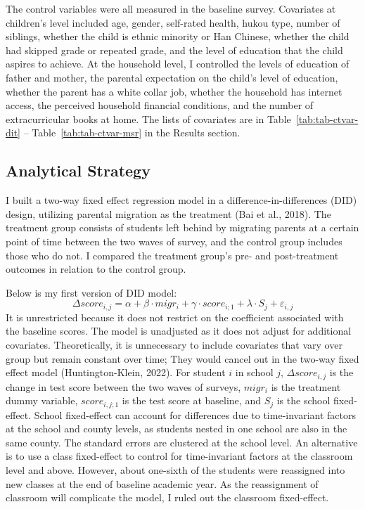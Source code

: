 \documentclass[
  man,floatsintext]{apa7}
\begin{document}
The control variables were all measured in the baseline survey. Covariates at children's level included age, gender, self-rated health, hukou type, number of siblings, whether the child is ethnic minority or Han Chinese, whether the child had skipped grade or repeated grade, and the level of education that the child aspires to achieve. At the household level, I controlled the levels of education of father and mother, the parental expectation on the child's level of education, whether the parent has a white collar job, whether the household has internet access, the perceived household financial conditions, and the number of extracurricular books at home. The lists of covariates are in Table~\ref{tab:tab-ctvar-dit} -- Table~\ref{tab:tab-ctvar-msr} in the Results section.

\hypertarget{analytical-strategy}{%
\subsection{Analytical Strategy}\label{analytical-strategy}}

I built a two-way fixed effect regression model in a difference-in-differences (DID) design, utilizing parental migration as the treatment (Bai et al., 2018). The treatment group consists of students left behind by migrating parents at a certain point of time between the two waves of survey, and the control group includes those who do not. I compared the treatment group's pre- and post-treatment outcomes in relation to the control group.

Below is my first version of DID model: \[\Delta score_{i,j} = \alpha + \beta \cdot migr_{i} + \gamma \cdot score_{i;1} + \lambda \cdot S_{j} + \varepsilon_{i,j}\] It is unrestricted because it does not restrict on the coefficient associated with the baseline scores. The model is unadjusted as it does not adjust for additional covariates. Theoretically, it is unnecessary to include covariates that vary over group but remain constant over time; They would cancel out in the two-way fixed effect model (Huntington-Klein, 2022). For student \(i\) in school \(j\), \(\Delta score_{i,j}\) is the change in test score between the two waves of surveys, \(migr_{i}\) is the treatment dummy variable, \(score_{i,j;1}\) is the test score at baseline, and \(S_{j}\) is the school fixed-effect. School fixed-effect can account for differences due to time-invariant factors at the school and county levels, as students nested in one school are also in the same county. The standard errors are clustered at the school level. An alternative is to use a class fixed-effect to control for time-invariant factors at the classroom level and above. However, about one-sixth of the students were reassigned into new classes at the end of baseline academic year. As the reassignment of classroom will complicate the model, I ruled out the classroom fixed-effect.
\end{document}
